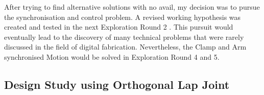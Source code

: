 After trying to find alternative solutions with no avail, my decision was to pursue the synchronisation and control problem. A revised working hypothesis was created and tested in the next Exploration Round 2 . This pursuit would eventually lead to the discovery of many technical problems that were rarely discussed in the field of digital fabrication. Nevertheless, the Clamp and Arm synchronised Motion would be solved in Exploration Round 4 and 5.

\subsection{Design Study using Orthogonal Lap Joint}
\label{subsection:exploration-1-design-study-using-orthogonal-lap-joint}


